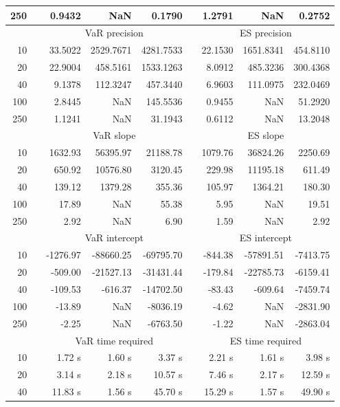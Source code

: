 {{\begin{longtable}{rr rrr r rrr}
250 && 0.9432  &    NaN  & 0.1790 && 1.2791  &    NaN  & 0.2752  \\ 
\hline 
 & & \multicolumn{3}{c}{VaR precision} &&  \multicolumn{3}{c}{ES precision} \\ \cline{3-5}  \cline{7-9}
10 &&  33.5022 & 2529.7671 & 4281.7533 & & 22.1530 & 1651.8341 & 454.8110 \\ 
20 &&  22.9004 & 458.5161 & 1533.1263 & & 8.0912 & 485.3236 & 300.4368 \\ 
40 &&  9.1378 & 112.3247 & 457.3440 & & 6.9603 & 111.0975 & 232.0469 \\ 
100 &&  2.8445 &    NaN & 145.5536 & & 0.9455 &    NaN & 51.2920 \\ 
250 &&  1.1241 &    NaN & 31.1943 & & 0.6112 &    NaN & 13.2048 \\ 
\hline 
 & & \multicolumn{3}{c}{ VaR slope} && \multicolumn{3}{c}{ES slope} \\ \cline{3-5}  \cline{7-9}
10 && 1632.93 & 56395.97 & 21188.78 && 1079.76 & 36824.26 & 2250.69 \\ 
20 && 650.92 & 10576.80 & 3120.45 && 229.98 & 11195.18 & 611.49 \\ 
40 && 139.12 & 1379.28 & 355.36 && 105.97 & 1364.21 & 180.30 \\ 
100 && 17.89 &  NaN & 55.38 && 5.95 &  NaN & 19.51 \\ 
250 && 2.92 &  NaN & 6.90 && 1.59 &  NaN & 2.92 \\ 
\hline 
 & & \multicolumn{3}{c}{ VaR intercept} &&  \multicolumn{3}{c}{ES intercept} \\ \cline{3-5}  \cline{7-9}
10 &&  -1276.97 & -88660.25 & -69795.70 && -844.38 & -57891.51 & -7413.75 \\ 
20 &&  -509.00 & -21527.13 & -31431.44 && -179.84 & -22785.73 & -6159.41 \\ 
40 &&  -109.53 & -616.37 & -14702.50 && -83.43 & -609.64 & -7459.74 \\ 
100 &&  -13.89 &  NaN & -8036.19 && -4.62 &  NaN & -2831.90 \\ 
250 &&  -2.25 &  NaN & -6763.50 && -1.22 &  NaN & -2863.04 \\ 
\hline 
 & & \multicolumn{3}{c}{VaR time required} && \multicolumn{3}{c}{ES time required} \\ \cline{3-5}  \cline{7-9}
10 & & 1.72 s & 1.60 s & 3.37 s && 2.21 s & 1.61 s & 3.98 s \\ 
20 & & 3.14 s & 2.18 s & 10.57 s && 7.46 s & 2.17 s & 12.59 s \\ 
40 & & 11.83 s & 1.56 s & 45.70 s && 15.29 s & 1.57 s & 49.90 s \\ 

\end{longtable}}}
